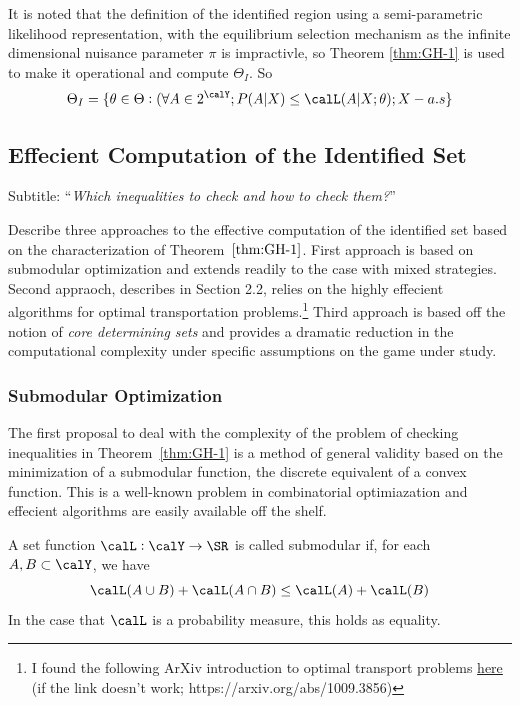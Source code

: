 It is noted that the definition of the identified region using a semi-parametric likelihood representation, with the equilibrium selection mechanism as the infinite dimensional nuisance parameter $\pi$ is impractivle, so Theorem \ref{thm:GH-1} is used to make it operational and compute $\Theta_I$. So 
\[\Theta_I = \{\theta \in \Theta: (\forall A \in 2^\calY; P(A|X) \leq \calL(A|X;\theta); X-a.s\}\]

\subsection{Effecient Computation of the Identified Set}

Subtitle: ``\emph{Which inequalities to check and how to check them?}''

Describe three approaches to the effective computation of the identified set based on the characterization of Theorem~$\ref{thm:GH-1}$. First approach is based on submodular optimization and extends readily to the case with mixed strategies. Second appraoch, describes in Section 2.2, relies on the highly effecient algorithms for optimal transportation problems.\footnote{I found the following ArXiv introduction to optimal transport problems \href{https://arxiv.org/abs/1009.3856}{here} (if the link doesn't work; https://arxiv.org/abs/1009.3856)} Third approach is based off the notion of \emph{core determining sets} and provides a dramatic reduction in the computational complexity under specific assumptions on the game under study.

\subsubsection{Submodular Optimization}

The first proposal to deal with the complexity of the problem of checking inequalities in Theorem~\ref{thm:GH-1} is a method of general validity based on the minimization of a submodular function, the discrete equivalent of a convex function. This is a well-known problem in combinatorial optimiazation and effecient algorithms are easily available off the shelf. 

\begin{definition}
	\label{def:GH-6}
	A set function $\calL:\calY\rightarrow\SR$ is called submodular if, for each $A, B \subset \calY$, we have 
	\[\calL(A\cup B) + \calL(A\cap B) \leq \calL(A) + \calL(B)\]
	In the case that $\calL$ is a probability measure, this holds as equality.
\end{definition}

